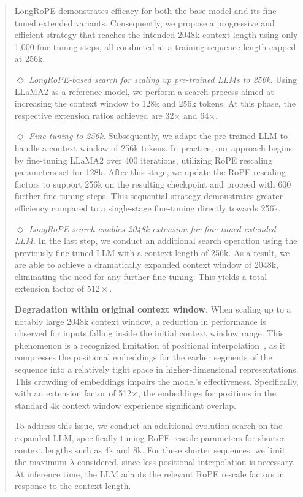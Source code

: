 \begin{abstract}
LongRoPE demonstrates efficacy for both the base model and its fine-tuned extended variants. Consequently, we propose a progressive and efficient strategy that reaches the intended 2048k context length using only 1,000 fine-tuning steps, all conducted at a training sequence length capped at 256k.

$\Diamond$ \textit{LongRoPE-based search for scaling up pre-trained LLMs to 256k.} Using LLaMA2 as a reference model, we perform a search process aimed at increasing the context window to 128k and 256k tokens. At this phase, the respective extension ratios achieved are 32$\times$ and 64$\times$.

$\Diamond$ \textit{Fine-tuning to 256k}. Subsequently, we adapt the pre-trained LLM to handle a context window of 256k tokens. In practice, our approach begins by fine-tuning LLaMA2 over 400 iterations, utilizing RoPE rescaling parameters set for 128k. After this stage, we update the RoPE rescaling factors to support 256k on the resulting checkpoint and proceed with 600 further fine-tuning steps. This sequential strategy demonstrates greater efficiency compared to a single-stage fine-tuning directly towards 256k.

$\Diamond$ \textit{LongRoPE search enables 2048k extension for fine-tuned extended LLM}. In the last step, we conduct an additional search operation using the previously fine-tuned LLM with a context length of 256k. As a result, we are able to achieve a dramatically expanded context window of 2048k, eliminating the need for any further fine-tuning. This yields a total extension factor of $512\times$.

\textbf{Degradation within original context window}.  When scaling up to a notably large 2048k context window, a reduction in performance is observed for inputs falling inside the initial context window range. This phenomenon is a recognized limitation of positional interpolation~\cite{pi}, as it compresses the positional embeddings for the earlier segments of the sequence into a relatively tight space in higher-dimensional representations. This crowding of embeddings impairs the model’s effectiveness. Specifically, with an extension factor of 512$\times$, the embeddings for positions in the standard 4k context window experience significant overlap.

To address this issue, we conduct an additional evolution search on the expanded LLM, specifically tuning RoPE rescale parameters for shorter context lengths such as 4k and 8k. For these shorter sequences, we limit the maximum $\lambda$ considered, since less positional interpolation is necessary. At inference time, the LLM adapts the relevant RoPE rescale factors in response to the context length.


\end{abstract}
